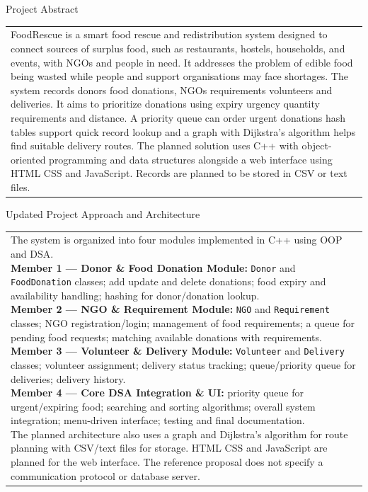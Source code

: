 \documentclass[12pt,a4paper]{article}
\newcommand{\sectiontitle}[1]{%
    {\color{GEUBlue}
    \fontsize{18}{22}\selectfont #1}
}
\newcommand{\answerbox}[2]{%
    \begin{tabularx}{\textwidth}{
        |>{\raggedright\arraybackslash}X|}
        \hline
        \parbox[t][#1][t]{\dimexpr\linewidth-12pt\relax}{
            \vspace{5pt}
            \fontsize{11}{13}\selectfont #2
        }\\
        \hline
    \end{tabularx}
}
\begin{document}
\vspace{0.70cm}

\sectiontitle{Project Abstract }

\vspace{0.05cm}


\vspace{0.12cm}

\answerbox{4.25cm}{FoodRescue is a smart food rescue and redistribution system designed to connect sources of surplus food, such as restaurants, hostels, households, and events, with NGOs and people in need. It addresses the problem of edible food being wasted while people and support organisations may face shortages. The system records donors food donations, NGOs requirements volunteers and deliveries. It aims to prioritize donations using expiry urgency quantity requirements and distance. A priority queue can order urgent donations hash tables support quick record lookup and a graph with Dijkstra's algorithm helps find suitable delivery routes. The planned solution uses C++ with object-oriented programming and data structures alongside a web interface using HTML CSS and JavaScript. Records are planned to be stored in CSV or text files.}

\vspace{0.90cm}

\sectiontitle{Updated Project Approach and Architecture }

\vspace{0.05cm}

\vspace{0.25cm}

\answerbox{7.25cm}{The system is organized into four modules implemented in C++ using OOP and DSA.\\[2pt]
\textbf{Member 1 --- Donor \& Food Donation Module:} \texttt{Donor} and \texttt{FoodDonation} classes; add update and delete donations; food expiry and availability handling; hashing for donor/donation lookup.\\[2pt]
\textbf{Member 2 --- NGO \& Requirement Module:} \texttt{NGO} and \texttt{Requirement} classes; NGO registration/login; management of food requirements; a queue for pending food requests; matching available donations with requirements.\\[2pt]
\textbf{Member 3 --- Volunteer \& Delivery Module:} \texttt{Volunteer} and \texttt{Delivery} classes; volunteer assignment; delivery status tracking; queue/priority queue for deliveries; delivery history.\\[2pt]
\textbf{Member 4 --- Core DSA Integration \& UI:} priority queue for urgent/expiring food; searching and sorting algorithms; overall system integration; menu-driven interface; testing and final documentation.\\[2pt]
The planned architecture also uses a graph and Dijkstra's algorithm for route planning with CSV/text files for storage. HTML CSS and JavaScript are planned for the web interface. The reference proposal does not specify a communication protocol or database server.}
\end{document}
